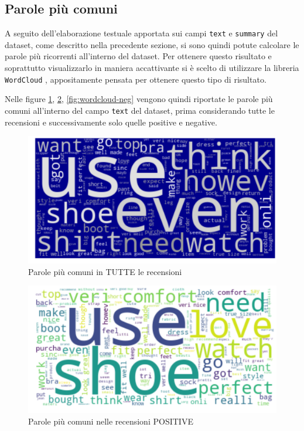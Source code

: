\documentclass[hidelinks, 12pt]{article}
\begin{document}
\subsection{Parole più comuni}

A seguito dell'elaborazione testuale apportata sui campi \texttt{text} e \texttt{summary} del dataset, come descritto nella precedente sezione, si sono quindi potute calcolare le parole più ricorrenti all'interno del dataset. Per ottenere questo risultato e soprattutto visualizzarlo in maniera accattivante si è scelto di utilizzare la libreria \texttt{WordCloud} \cite{site:wordcloud}, appositamente pensata per ottenere questo tipo di risultato.

Nelle figure \ref{fig:wordcloud-all}, \ref{fig:wordcloud-pos}, \ref{fig:wordcloud-neg} vengono quindi riportate le parole più comuni all'interno del campo \texttt{text} del dataset, prima considerando tutte le recensioni e successivamente solo quelle positive e negative.

\begin{figure}[H]
	\centering
	\includegraphics[scale=0.36]{images/04_01_wordcloud_all.png}
	\caption[Parole più comuni in TUTTE le recensioni]{Parole più comuni in TUTTE le recensioni}
	\label{fig:wordcloud-all}
\end{figure}

\begin{figure}[H]
	\centering
	\includegraphics[scale=0.36]{images/04_02_wordcloud_pos.png}
	\caption[Parole più comuni nelle recensioni POSITIVE]{Parole più comuni nelle recensioni POSITIVE}
	\label{fig:wordcloud-pos}
\end{figure}
\end{document}
